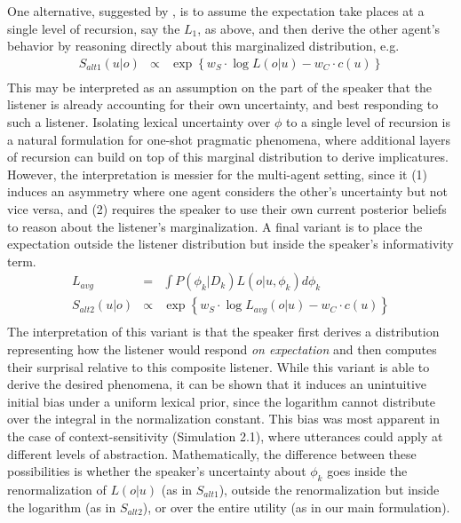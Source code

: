\documentclass[11pt, floatsintext]{apa6}
\begin{document}
One alternative, suggested by , is to assume the expectation take places at a single level of recursion, say the $L_1$, as above, and then derive the other agent's behavior by reasoning directly about this marginalized distribution, e.g.
$$
\begin{array}{rcl}
S_{alt1}(u|o) & \propto & \exp\left\{w_S \cdot \log L(o|u) - w_C \cdot c(u)\right\} \\
\end{array}
$$
This may be interpreted as an assumption on the part of the speaker that the listener is already accounting for their own uncertainty, and best responding to such a listener.
Isolating lexical uncertainty over $\phi$ to a single level of recursion is a natural formulation for one-shot pragmatic phenomena, where additional layers of recursion can build on top of this marginal distribution to derive implicatures.
However, the interpretation is messier for the multi-agent setting, since it (1) induces an asymmetry where one agent considers the other's uncertainty but not vice versa, and (2) requires the speaker to use their own current posterior beliefs to reason about the listener's marginalization.
A final variant is to place the expectation outside the listener distribution but inside the speaker's informativity term.
$$
\begin{array}{rcl}
L_{avg} & = & \int P(\phi_k | D_k) L(o|u, \phi_k) d\phi_k \\
S_{alt2}(u|o) & \propto & \exp\left\{w_S \cdot \log L_{avg}(o|u) - w_C \cdot c(u)\right\} \\
\end{array}
$$
The interpretation of this variant is that the speaker first derives a distribution representing how the listener would respond \emph{on expectation} and then computes their surprisal relative to this composite listener.
While this variant is able to derive the desired phenomena, it can be shown that it induces an unintuitive initial bias under a uniform lexical prior, since the logarithm cannot distribute over the integral in the normalization constant. 
This bias was most apparent in the case of context-sensitivity (Simulation 2.1), where utterances could apply at different levels of abstraction.
Mathematically, the difference between these possibilities is whether the speaker's uncertainty about $\phi_k$ goes inside the renormalization of $L(o|u)$ (as in $S_{alt1}$), outside the renormalization but inside the logarithm (as in $S_{alt2}$), or over the entire utility (as in our main formulation).
 
\end{document}
